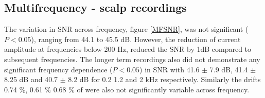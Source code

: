 \subsection{Multifrequency - scalp recordings}
The variation in SNR across frequency, figure \ref{MFSNR}, was not significant  ($P<0.05$), ranging from 44.1 to 45.5 dB.  However, the reduction of current amplitude at frequencies below 200 Hz, reduced the SNR by 1dB compared to subsequent frequencies. The longer term recordings also did not demonstrate any significant frequency dependence ($P<0.05$) in SNR with 41.6 $\pm$ 7.9 dB, 41.4 $\pm$ 8.25 dB and 40.7 $\pm$ 8.2 dB for 0.2 1.2 and 2 kHz respectively. Similarly the drifts 0.74 \%, 0.61 \% 0.68 \% of were also not significantly variable across frequency.